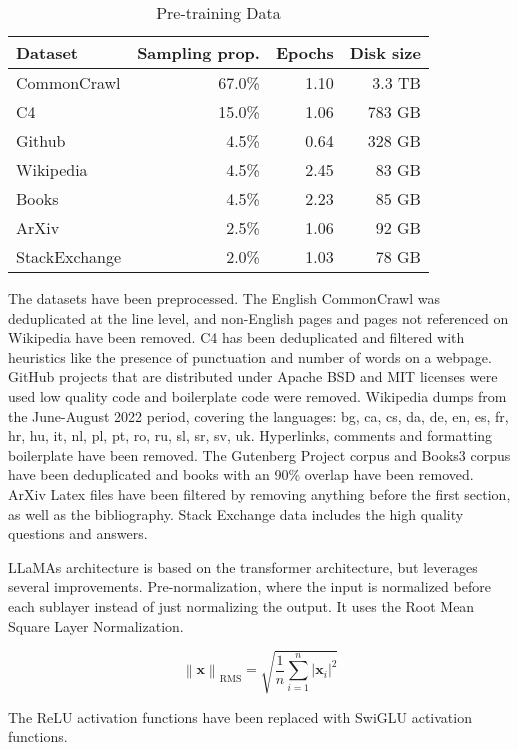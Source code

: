 \begin{table}[htbp]
\centering
\caption{Pre-training Data\cite{touvron2023llama}}
\begin{tabular}{|l|r|r|r|}
\hline
\textbf{Dataset} & \textbf{Sampling prop.} & \textbf{Epochs} & \textbf{Disk size} \\
\hline
CommonCrawl & 67.0\% & 1.10 & 3.3 TB \\
C4 & 15.0\% & 1.06 & 783 GB \\
Github & 4.5\% & 0.64 & 328 GB \\
Wikipedia & 4.5\% & 2.45 & 83 GB \\
Books & 4.5\% & 2.23 & 85 GB \\
ArXiv & 2.5\% & 1.06 & 92 GB \\
StackExchange & 2.0\% & 1.03 & 78 GB \\
\hline
\end{tabular}
\end{table}

The datasets have been preprocessed. The English CommonCrawl  was deduplicated at the line level, and non-English pages and pages not referenced on Wikipedia have been removed. C4 has been deduplicated and filtered with heuristics like the presence of punctuation and number of words on a webpage. GitHub projects that are distributed under Apache BSD and MIT licenses were used low quality code and boilerplate code were removed.
Wikipedia dumps from the June-August 2022 period, covering the languages: bg, ca, cs, da, de, en, es, fr, hr, hu, it, nl, pl, pt, ro, ru, sl, sr, sv, uk. Hyperlinks, comments and formatting boilerplate have been removed. The Gutenberg Project corpus and Books3 corpus have been deduplicated and books with an 90\% overlap have been removed. 
ArXiv Latex files have been filtered by removing anything before the first section, as well as the bibliography. Stack Exchange data includes the high quality questions and answers. 




LLaMAs architecture is based on the transformer architecture, but leverages several improvements. Pre-normalization, where the input is normalized before each sublayer instead  of just normalizing the output. It uses the Root Mean Square Layer Normalization\cite{zhang2019root}.

\newcommand{\norm}[1]{\left\lVert#1\right\rVert}

\[
\norm{\mathbf{x}}_{\text{RMS}} = \sqrt{\frac{1}{n} \sum_{i=1}^n |\mathbf{x}_i|^2}
\]


The ReLU activation functions have been replaced with SwiGLU activation functions.



